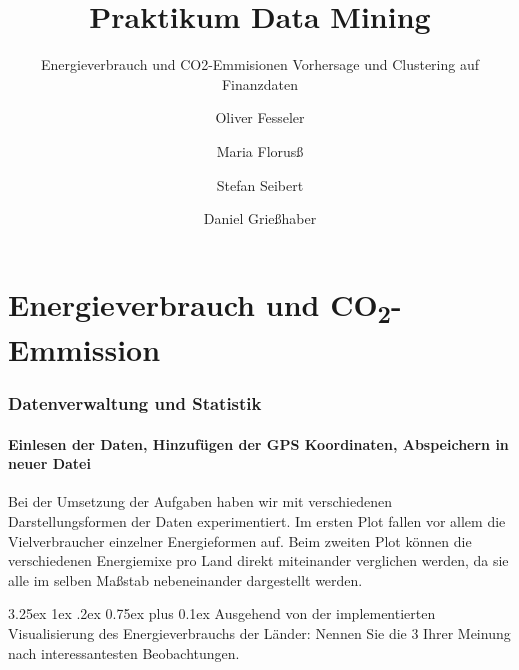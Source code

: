 \documentclass[12pt,a4paper]{scrartcl}
\makeatletter
\renewcommand\subparagraph{\@startsection{subparagraph}{5}{\parindent}%
    {3.25ex \@plus1ex \@minus .2ex}%
    {0.75ex plus 0.1ex}%
    {\normalfont\normalsize\bfseries}}
\makeatother
\begin{document}
\title{Praktikum Data Mining}
\subtitle{Energieverbrauch und CO2-Emmisionen \newline Vorhersage und Clustering auf Finanzdaten}
\author{Oliver Fesseler \and Maria Florus\ss \and Stefan Seibert \and  Daniel Grie\ss haber}
\maketitle
\newpage

\part*{Energieverbrauch und CO\textsubscript{2}-Emmission}

\section*{Datenverwaltung und Statistik}
\subsection*{Einlesen der Daten, Hinzuf\"ugen der GPS Koordinaten, Abspeichern in neuer Datei}
Bei der Umsetzung der Aufgaben haben wir mit verschiedenen Darstellungsformen der Daten experimentiert. Im ersten Plot fallen vor allem die Vielverbraucher einzelner Energieformen auf. Beim zweiten Plot k\"onnen die verschiedenen Energiemixe pro Land direkt miteinander verglichen werden, da sie alle im selben Ma\ss stab nebeneinander dargestellt werden.

\subparagraph{ Ausgehend von der implementierten Visualisierung des Energieverbrauchs der L\"ander: Nennen Sie die 3 Ihrer Meinung nach interessantesten Beobachtungen.}
\end{document}

